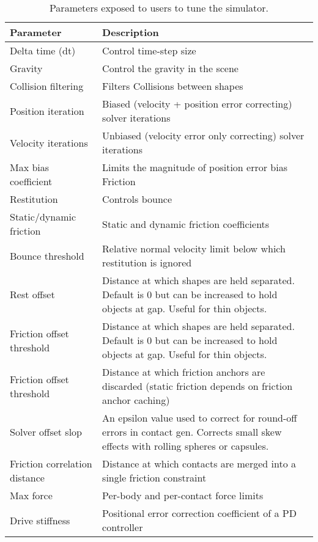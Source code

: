 \begin{table}
  \centering
  \begin{threeparttable}[c]
    \caption[Simulator tuning parameters]{Parameters exposed to users to tune the simulator.}
    \label{tb:simulator_tune_parameters}
    \begin{tabular}{C{4cm} C{10cm}}
      \toprule 
      Parameter & Description\\
      \midrule 
      Delta time (dt) & Control time-step size\\
      Gravity & Control the gravity in the scene\\
      Collision filtering & Filters Collisions between shapes\\
      Position iteration & Biased (velocity + position error correcting) solver iterations\\
      Velocity iterations & Unbiased (velocity error only correcting) solver iterations\\
      Max bias coefficient & Limits the magnitude of position error bias Friction\\
      Restitution & Controls bounce\\
      Static/dynamic friction & Static and dynamic friction coefficients\\ \midrule 
      Bounce threshold & Relative normal velocity limit below which restitution is ignored\\ \midrule 
      Rest offset & Distance at which shapes are held separated. Default is 0 but can be increased to hold objects at gap. Useful for thin objects.\\ \midrule 
      Friction offset threshold & Distance at which shapes are held separated. Default is 0 but can be increased to hold objects at gap. Useful for thin objects.\\ \midrule 
      Friction offset threshold & Distance at which friction anchors are discarded (static friction depends on friction anchor caching)\\ \midrule 
      Solver offset slop & An epsilon value used to correct for round-off errors in contact gen. Corrects small skew effects with rolling spheres or capsules.\\ \midrule 
      Friction correlation distance & Distance at which contacts are merged into a single friction constraint\\ \midrule 
      Max force & Per-body and per-contact force limits\\
      Drive stiffness & Positional error correction coefficient of a PD controller\\

\end{tabular}
\end{threeparttable}
\end{table}
